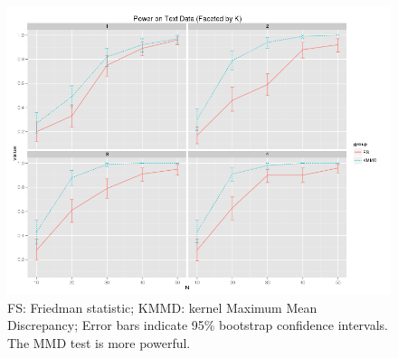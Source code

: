 \begin{figure}
  \centering
  \includegraphics[width=\linewidth]{power_string.png}
  \caption{FS: Friedman statistic; KMMD: kernel Maximum Mean
    Discrepancy; Error bars indicate 95\% bootstrap confidence
    intervals.  The MMD test is more powerful.}
  \label{fig:power_string}
\end{figure}

